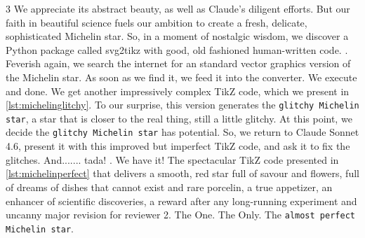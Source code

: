 \documentclass[11pt]{article}
\begin{document}
\begin{multicols}{3}
We appreciate its abstract beauty, as well as Claude's diligent efforts. But our faith in beautiful science fuels our ambition to create a fresh, delicate, sophisticated Michelin star. So, in a moment of nostalgic wisdom, we discover a Python package called svg2tikz with good, old fashioned human-written code. . Feverish again, we search the internet for an standard vector graphics version of the Michelin star. As soon as we find it, we feed it into the converter. We execute and done. We get another impressively complex TikZ code, which we present in \autoref{lst:michelinglitchy}. To our surprise, this version generates the \texttt{glitchy Michelin star}, a star that is closer to the real thing,  still a little glitchy.
At this point, we decide the \texttt{glitchy Michelin star} has potential. So, we return to Claude Sonnet 4.6, present it with this improved but imperfect TikZ code, and ask it to fix the glitches. And....... tada! . We have it! The spectacular TikZ code presented in \autoref{lst:michelinperfect} that delivers a smooth, red star full of savour and flowers, full of dreams of dishes that cannot exist and rare porcelin, a true appetizer, an enhancer of scientific discoveries, a reward after any long-running experiment and uncanny major revision for reviewer 2. The One. The Only. The \texttt{almost perfect Michelin star}. 



\end{multicols}
\end{document}
